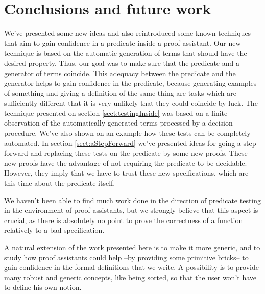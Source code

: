 \section{Conclusions and future work}


We've presented some new ideas and also reintroduced some known techniques that aim to gain confidence in a predicate inside a proof assistant. Our new technique is based on the automatic generation of terms that should have the desired property. Thus, our goal was to make sure that the predicate and a generator of terms coincide. This adequacy between the predicate and the generator helps to gain confidence in the predicate, because generating examples of something and giving a definition of the same thing are tasks which are sufficiently different that it is very unlikely that they could coincide by luck. The technique presented on section \ref{sect:testingInside} was based on a finite observation of the automatically generated terms processed by a decision procedure. We've also shown on an example how these tests can be completely automated. In section \ref{sect:aStepForward} we've presented ideas for going a step forward and replacing these tests on the predicate by some new proofs. These new proofs have the advantage of not requiring the predicate to be decidable. However, they imply that we have to trust these new specifications, which are this time about the predicate itself.

We haven't been able to find much work done in the direction of predicate testing in the environment of proof assistants, but we strongly believe that this aspect is crucial, as there is absolutely no point to prove the correctness of a function relatively to a bad specification. 

A natural extension of the work presented here is to make it more generic, and to study how proof assistants could help --by providing some primitive bricks-- to gain confidence in the formal definitions that we write. A possibility is to provide many robust and generic concepts, like being sorted, so that the user won't have to define his own notion. 